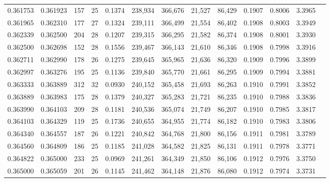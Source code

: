 \begin{tabular}{rrrrrrrrrrrrr}
0.361753 & 0.361923 &    157 &    25 &                                     0.1374 & 238,934 & 366,676 &  21,527 &  86,429 & 0.1907 & 0.8006 & 3.3965 \\
0.361965 & 0.362310 &    177 &    27 &                                     0.1324 & 239,111 & 366,499 &  21,554 &  86,402 & 0.1908 & 0.8003 & 3.3949 \\
0.362339 & 0.362500 &    204 &    28 &                                     0.1207 & 239,315 & 366,295 &  21,582 &  86,374 & 0.1908 & 0.8001 & 3.3930 \\
0.362500 & 0.362698 &    152 &    28 &                                     0.1556 & 239,467 & 366,143 &  21,610 &  86,346 & 0.1908 & 0.7998 & 3.3916 \\
0.362711 & 0.362990 &    178 &    26 &                                     0.1275 & 239,645 & 365,965 &  21,636 &  86,320 & 0.1909 & 0.7996 & 3.3899 \\
0.362997 & 0.363276 &    195 &    25 &                                     0.1136 & 239,840 & 365,770 &  21,661 &  86,295 & 0.1909 & 0.7994 & 3.3881 \\
0.363333 & 0.363889 &    312 &    32 &                                     0.0930 & 240,152 & 365,458 &  21,693 &  86,263 & 0.1910 & 0.7991 & 3.3852 \\
0.363889 & 0.363983 &    175 &    28 &                                     0.1379 & 240,327 & 365,283 &  21,721 &  86,235 & 0.1910 & 0.7988 & 3.3836 \\
0.363990 & 0.364103 &    209 &    28 &                                     0.1181 & 240,536 & 365,074 &  21,749 &  86,207 & 0.1910 & 0.7985 & 3.3817 \\
0.364103 & 0.364329 &    119 &    25 &                                     0.1736 & 240,655 & 364,955 &  21,774 &  86,182 & 0.1910 & 0.7983 & 3.3806 \\
0.364340 & 0.364557 &    187 &    26 &                                     0.1221 & 240,842 & 364,768 &  21,800 &  86,156 & 0.1911 & 0.7981 & 3.3789 \\
0.364560 & 0.364809 &    186 &    25 &                                     0.1185 & 241,028 & 364,582 &  21,825 &  86,131 & 0.1911 & 0.7978 & 3.3771 \\
0.364822 & 0.365000 &    233 &    25 &                                     0.0969 & 241,261 & 364,349 &  21,850 &  86,106 & 0.1912 & 0.7976 & 3.3750 \\
0.365000 & 0.365059 &    201 &    26 &                                     0.1145 & 241,462 & 364,148 &  21,876 &  86,080 & 0.1912 & 0.7974 & 3.3731 \\

\end{tabular}
